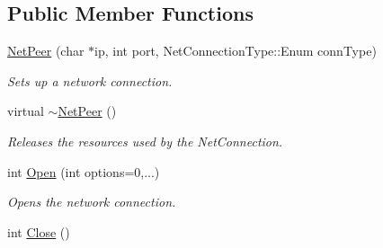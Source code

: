 \subsection*{Public Member Functions}
\begin{DoxyCompactItemize}
\item 
\hypertarget{class_rhesus_1_1_toolkit_1_1_net_1_1_net_peer_a7b3c18f79329e009a8d7551a1d2dc2d8}{\hyperlink{class_rhesus_1_1_toolkit_1_1_net_1_1_net_peer_a7b3c18f79329e009a8d7551a1d2dc2d8}{Net\-Peer} (char $\ast$ip, int port, Net\-Connection\-Type\-::\-Enum conn\-Type)}\label{class_rhesus_1_1_toolkit_1_1_net_1_1_net_peer_a7b3c18f79329e009a8d7551a1d2dc2d8}

\begin{DoxyCompactList}\small\item\em Sets up a network connection. \end{DoxyCompactList}\item 
\hypertarget{class_rhesus_1_1_toolkit_1_1_net_1_1_net_peer_a1916bf3bc08d58f239a2c2b86a058f8d}{virtual \hyperlink{class_rhesus_1_1_toolkit_1_1_net_1_1_net_peer_a1916bf3bc08d58f239a2c2b86a058f8d}{$\sim$\-Net\-Peer} ()}\label{class_rhesus_1_1_toolkit_1_1_net_1_1_net_peer_a1916bf3bc08d58f239a2c2b86a058f8d}

\begin{DoxyCompactList}\small\item\em Releases the resources used by the Net\-Connection. \end{DoxyCompactList}\item 
\hypertarget{class_rhesus_1_1_toolkit_1_1_net_1_1_net_peer_a69e9672c8b99af1c7addc1a18a65a0e1}{int \hyperlink{class_rhesus_1_1_toolkit_1_1_net_1_1_net_peer_a69e9672c8b99af1c7addc1a18a65a0e1}{Open} (int options=0,...)}\label{class_rhesus_1_1_toolkit_1_1_net_1_1_net_peer_a69e9672c8b99af1c7addc1a18a65a0e1}

\begin{DoxyCompactList}\small\item\em Opens the network connection. \end{DoxyCompactList}\item 
\hypertarget{class_rhesus_1_1_toolkit_1_1_net_1_1_net_peer_a7f8d748a7c50d8e2bd4c1c70580db0e2}{int \hyperlink{class_rhesus_1_1_toolkit_1_1_net_1_1_net_peer_a7f8d748a7c50d8e2bd4c1c70580db0e2}{Close} ()}\label{class_rhesus_1_1_toolkit_1_1_net_1_1_net_peer_a7f8d748a7c50d8e2bd4c1c70580db0e2}


\end{DoxyCompactItemize}
